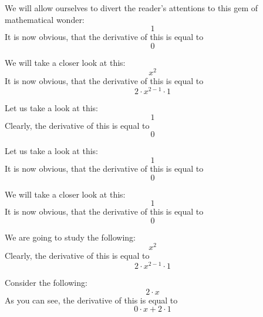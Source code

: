 \documentclass{article}
\begin{document}
We will allow ourselves to divert the reader's attentions to this gem of mathematical wonder:
\begin{equation}
1 
\end{equation}
It is now obvious, that the derivative of this is equal to
\begin{equation}
0 
\end{equation}

We will take a closer look at this:
\begin{equation}
x ^{2 } 
\end{equation}
It is now obvious, that the derivative of this is equal to
\begin{equation}
2 \cdot x ^{2 - 1 } \cdot 1 
\end{equation}

Let us take a look at this:
\begin{equation}
1 
\end{equation}
Clearly, the derivative of this is equal to
\begin{equation}
0 
\end{equation}

Let us take a look at this:
\begin{equation}
1 
\end{equation}
It is now obvious, that the derivative of this is equal to
\begin{equation}
0 
\end{equation}

We will take a closer look at this:
\begin{equation}
1 
\end{equation}
It is now obvious, that the derivative of this is equal to
\begin{equation}
0 
\end{equation}

We are going to study the following:
\begin{equation}
x ^{2 } 
\end{equation}
Clearly, the derivative of this is equal to
\begin{equation}
2 \cdot x ^{2 - 1 } \cdot 1 
\end{equation}

Consider the following:
\begin{equation}
2 \cdot x 
\end{equation}
As you can see, the derivative of this is equal to
\begin{equation}
0 \cdot x + 2 \cdot 1 
\end{equation}
\end{document}
